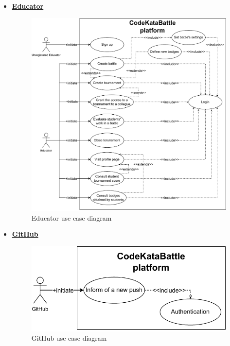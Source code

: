 \documentclass{article}
\begin{document}
{\begin{itemize}
                    N.B: The repository citated in this diagram, on which the student upload their solution, it's not
                    part of the platform. The system, in fact, relies on a third party service (GitHub) to handle the repository.
                    This use case was specified in order to better clarify the tight interaction between the system and the student trought the GitHub service.
                \item \underline{\large{\textbf{Educator}}}
                    \begin{figure}[H]
                        \centering
                        \includegraphics[scale=0.4]{images/3.2.2_UseCaseDiagrams/CaseDiagramEducator}
                        \caption{Educator use case diagram}
                        \label{fig:educatorUseCaseDiagram}
                    \end{figure}
                \item \underline{\large{\textbf{GitHub}}}
                    \begin{figure}[H]
                        \centering
                        \includegraphics[scale=0.4]{images/3.2.2_UseCaseDiagrams/CaseDiagramGitHub}
                        \caption{GitHub use case diagram}
                        \label{fig:gitHubUseCaseDiagram}
                    \end{figure}
                

\end{itemize}}
\end{document}
